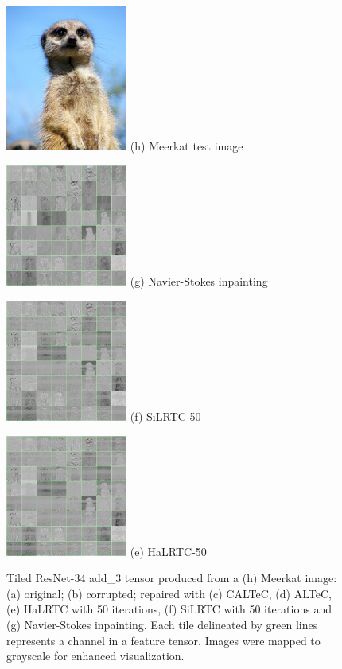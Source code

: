 \documentclass[conference,letterpaper]{IEEEtran}
\begin{document}
\begin{figure}[tb]
%
\hfill
\vspace{6pt}
	\begin{minipage}[b]{0.24\linewidth}
		\centering
		\includegraphics[width=4cm]{44.meerkat_tina_whitelegg.jpg}
		(h) Meerkat test image
	\end{minipage}
\begin{minipage}[b]{0.24\linewidth}
	\centering
	\includegraphics[width=4cm]{tiledinpaintnsgrid.jpg}
	(g) Navier-Stokes inpainting
\end{minipage}
%
\begin{minipage}[b]{0.24\linewidth}
	\centering
	\includegraphics[width=4cm]{tiledsilrtc50grid.jpg}
	(f) SiLRTC-50
	\end{minipage}
\begin{minipage}[b]{0.24\linewidth}
	\centering
	\includegraphics[width=4cm]{tiledhalrtc50grid.jpg}
	(e) HaLRTC-50
	\end{minipage}
\caption{Tiled ResNet-34 add\_3 tensor produced from a (h) Meerkat image: (a) original; (b) corrupted; repaired with (c) CALTeC, (d) ALTeC, (e) HaLRTC with 50 iterations, (f) SiLRTC with 50 iterations and (g) Navier-Stokes inpainting. Each tile delineated by green lines represents a channel in a feature tensor. Images were mapped to grayscale for enhanced visualization.}
\label{fig:exp:tiled}
\end{figure}
\end{document}

